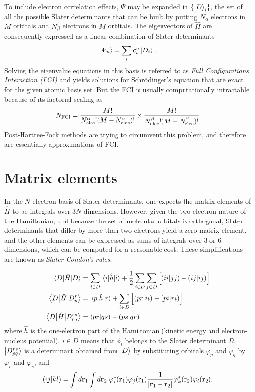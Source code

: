 \documentclass[./thesis.tex]{subfiles}
\begin{document}
To include electron correlation effects, $\Psi$ may be expanded in
$\{\ket D_i \}$, the set of all the possible Slater determinants that can be built by putting $N_\alpha$ electrons in $M$ orbitals and $N_\beta$ electrons in $M$ orbitals.
The eigenvectors of $\widehat{H}$ are consequently expressed as a linear combination of Slater determinants 
\begin{equation}
\ket{\Psi_n} = \sum_{i} c_i^n \ket{D_i}.
\end{equation}
Solving the eigenvalue equations in this basis is referred to as \emph{Full Configurations Interaction (FCI)} and yields solutions for Schrödinger's equation that are exact for the given atomic basis set.
But the FCI is usually computationally intractable because of its factorial scaling as
\begin{equation}
N_\text{FCI} = \frac{M!}{{N_\text{elec}^\alpha} ! (M-{N_\text{elec}^\alpha})!} \times \frac{M!}{{N_\text{elec}^\beta} ! (M-{N_\text{elec}^\beta})!}
\end{equation}
Post-Hartree-Fock methods are trying to circumvent this problem, and therefore
are essentially approximations of FCI.

\section{Matrix elements}
In the $N$-electron basis of Slater determinants, one expects the matrix elements of $\widehat H$ to be integrals over $3N$ dimensions.
However, given the two-electron nature of the Hamiltonian, and because the set of molecular orbitals is orthogonal, Slater determinants that differ by more than two electrons yield a zero matrix element, and the other elements can be expressed as sums of integrals over 3 or 6 dimensions, which can be computed for a reasonable cost. These simplifications are known as \emph{Slater-Condon's rules}.

\begin{align}
\mel{D}{\hat{H}}{D} & = \sum_{i\in D} \mel{i}{\hat{h}}{i} + \frac{1}{2} \sum_{i\in D} \sum_{j\in D} \Big [ (ii|jj) - (ij|ij) \Big ]      \\
\mel{D}{\hat{H}}{D_p^r} & = \mel{p}{\hat{h}}{r} + \sum_{i\in D} \Big [ (pr|ii) - (pi|ri) \Big ]        \\
\mel{D}{\hat{H}}{D_{pq}^{rs}} & = (pr|qs) - (ps|qr)
\end{align}
where $\hat{h}$ is the one-electron part of the Hamiltonian (kinetic energy and
electron-nucleus potential), $i \in D$ means that $\phi_i$ belongs to the
Slater determinant $D$, $\ket {D_{pq}^{rs}}$ is a determinant obtained from $\ket
D$ by substituting orbitals $\varphi_p$ and $\varphi_q$ by $\varphi_r$ and
$\varphi_s$, and
\begin{equation}
(ij|kl) = \int d{\bf r}_1 \int d{\bf r}_2 \; \varphi^*_i({\bf r}_1)\varphi_j({\bf r}_1) \frac{1}{|{\bf r}_1 - {\bf r}_2|} \varphi^*_k({\bf r}_2)\varphi_l({\bf r}_2).
\end{equation}
\end{document}
